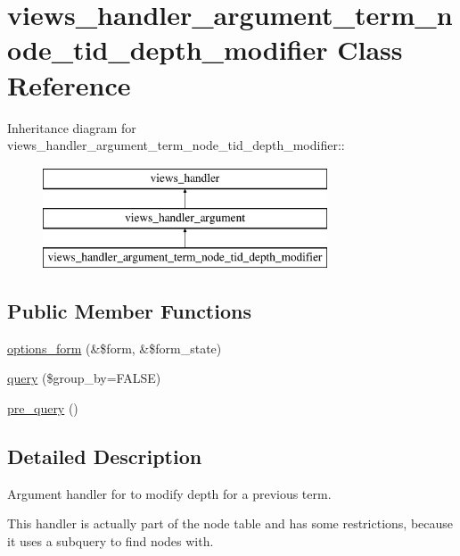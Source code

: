 \hypertarget{classviews__handler__argument__term__node__tid__depth__modifier}{
\section{views\_\-handler\_\-argument\_\-term\_\-node\_\-tid\_\-depth\_\-modifier Class Reference}
\label{classviews__handler__argument__term__node__tid__depth__modifier}
}
Inheritance diagram for views\_\-handler\_\-argument\_\-term\_\-node\_\-tid\_\-depth\_\-modifier::\begin{figure}[H]
\begin{center}
\leavevmode
\includegraphics[height=3cm]{classviews__handler__argument__term__node__tid__depth__modifier}
\end{center}
\end{figure}
\subsection*{Public Member Functions}
\begin{DoxyCompactItemize}
\item 
\hyperlink{classviews__handler__argument__term__node__tid__depth__modifier_aa4796e763923377f41dbf9bf415d96e8}{options\_\-form} (\&\$form, \&\$form\_\-state)
\item 
\hyperlink{classviews__handler__argument__term__node__tid__depth__modifier_af38aca7016ef74b4fe04dc33fb332748}{query} (\$group\_\-by=FALSE)
\item 
\hyperlink{classviews__handler__argument__term__node__tid__depth__modifier_a278abcb2e424241efa1361d01be89eb1}{pre\_\-query} ()
\end{DoxyCompactItemize}


\subsection{Detailed Description}
Argument handler for to modify depth for a previous term.

This handler is actually part of the node table and has some restrictions, because it uses a subquery to find nodes with. 

